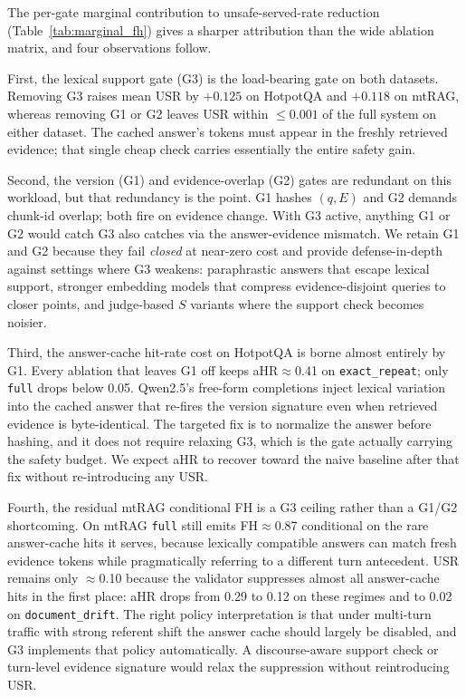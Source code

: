 \documentclass[11pt]{article}
\begin{document}
The per-gate marginal contribution to unsafe-served-rate reduction
(Table~\ref{tab:marginal_fh}) gives a sharper attribution than the
wide ablation matrix, and four observations follow.

First, the lexical support gate (G3) is the load-bearing gate on
both datasets. Removing G3 raises mean USR by $+0.125$ on HotpotQA
and $+0.118$ on mtRAG, whereas removing G1 or G2 leaves USR within
$\le 0.001$ of the full system on either dataset. The cached
answer's tokens must appear in the freshly retrieved evidence; that
single cheap check carries essentially the entire safety gain.

Second, the version (G1) and evidence-overlap (G2) gates are
redundant on this workload, but that redundancy is the point. G1
hashes $(q, E)$ and G2 demands chunk-id overlap; both fire on
evidence change. With G3 active, anything G1 or G2 would catch G3
also catches via the answer-evidence mismatch. We retain G1 and G2
because they fail \emph{closed} at near-zero cost and provide
defense-in-depth against settings where G3 weakens: paraphrastic
answers that escape lexical support, stronger embedding models that
compress evidence-disjoint queries to closer points, and judge-based
$S$ variants where the support check becomes noisier.

Third, the answer-cache hit-rate cost on HotpotQA is borne almost
entirely by G1. Every ablation that leaves G1 off keeps
aHR$\approx$0.41 on \texttt{exact\_repeat}; only \texttt{full} drops
below 0.05. Qwen2.5's free-form completions inject lexical variation
into the cached answer that re-fires the version signature even when
retrieved evidence is byte-identical. The targeted fix is to
normalize the answer before hashing, and it does not require relaxing
G3, which is the gate actually carrying the safety budget. We expect
aHR to recover toward the naive baseline after that fix without
re-introducing any USR.

Fourth, the residual mtRAG conditional FH is a G3 ceiling rather
than a G1/G2 shortcoming. On mtRAG \texttt{full} still emits
FH$\approx$0.87 conditional on the rare answer-cache hits it
serves, because lexically compatible answers can match fresh
evidence tokens while pragmatically referring to a different turn
antecedent. USR remains only $\approx$0.10 because the validator
suppresses almost all answer-cache hits in the first place: aHR
drops from 0.29 to 0.12 on these regimes and to 0.02 on
\texttt{document\_drift}. The right policy interpretation is that
under multi-turn traffic with strong referent shift the answer
cache should largely be disabled, and G3 implements that policy
automatically. A discourse-aware support check or turn-level
evidence signature would relax the suppression without
reintroducing USR.
\end{document}
